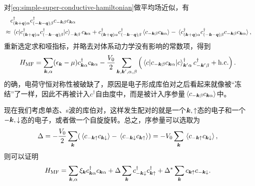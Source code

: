 \documentclass[hyperref, UTF8, a4paper]{ctexart}
\begin{document}
对\eqref{eq:simple-super-conductive-hamiltonian}做平均场近似，有
\[
    \begin{aligned}
        & \quad {c}^\dagger_{(\vb*{k} + \vb*{q}) \alpha} {c}^\dagger_{( - \vb*{k} - \vb*{q}) \beta} {c}_{-\vb*{k} \beta} {c}_{\vb*{k} \alpha} \\
        &\approx \expval*{{c}^\dagger_{(\vb*{k} + \vb*{q}) \alpha} {c}^\dagger_{( - \vb*{k} - \vb*{q}) \beta}} {c}_{-\vb*{k} \beta} {c}_{\vb*{k} \alpha} + {c}^\dagger_{(\vb*{k} + \vb*{q}) \alpha} {c}^\dagger_{( - \vb*{k} - \vb*{q}) \beta} \expval*{{c}_{-\vb*{k} \beta} {c}_{\vb*{k} \alpha}} - \expval*{{c}^\dagger_{(\vb*{k} + \vb*{q}) \alpha} {c}^\dagger_{( - \vb*{k} - \vb*{q}) \beta} {c}_{-\vb*{k} \beta} {c}_{\vb*{k} \alpha}},
    \end{aligned}
\]
重新选定求和哑指标，并略去对体系动力学没有影响的常数项，得到
\begin{equation}
    {H}_\text{MF} = \sum_{\vb*{k}, \alpha} (\epsilon_{\vb*{k}} - \mu) {c}_{\vb*{k} \alpha}^\dagger {c}_{\vb*{k} \alpha} - \frac{V_0}{2} \sum_{\vb*{k}, \vb*{k}', \alpha, \beta} \left(
        \expval*{{c}_{-\vb*{k} \beta} {c}_{\vb*{k} \alpha}} {c}^\dagger_{\vb*{k}' \alpha} {c}^\dagger_{- \vb*{k}' \beta} + \text{h.c.} 
    \right).
\end{equation}
的确，电荷守恒对称性被破缺了，原因是电子形成库伯对之后看起来就像被“冻结”了一样，因此不再被计入${c}^\dagger$自由度中，而是被计入序参量$\expval*{{c}_{-\vb*{k} \beta} {c}_{\vb*{k} \alpha}}$中。

现在我们考虑单态、s波的库伯对，这样发生配对的就是一个$\vb*{k}, \uparrow$态的电子和一个$-\vb*{k}, \downarrow$态的电子，或者做一个自旋旋转。总之，序参量可以选取为
\begin{equation}
    \Delta = - \frac{V_0}{2} \sum_{\vb*{k}} (
        \expval*{{c}_{-\vb*{k}\uparrow} {c}_{\vb*{k} \downarrow}} - \expval*{{c}_{-\vb*{k} \downarrow} {c}_{\vb*{k} \uparrow}}
    ) = -V_0 \sum_{\vb*{k}} \expval*{{c}_{-\vb*{k}\uparrow} {c}_{\vb*{k} \downarrow}} ,
    \label{eq:superconductive-order-parameter}
\end{equation}
则可以证明
\begin{equation}
    {H}_\text{MF} = \sum_{\vb*{k}, \alpha} \xi_{\vb*{k}} {c}_{\vb*{k} \alpha}^\dagger {c}_{\vb*{k} \alpha} 
    + \Delta \sum_{\vb*{k}} {c}_{-\vb*{k} \downarrow}^\dagger {c}^\dagger_{\vb*{k} \uparrow}
    + \Delta^* \sum_{\vb*{k}} {c}_{\vb*{k} \uparrow} {c}_{-\vb*{k} \downarrow}.
    \label{eq:s-wave-superconductive-hamiltonian}
\end{equation}
\end{document}
